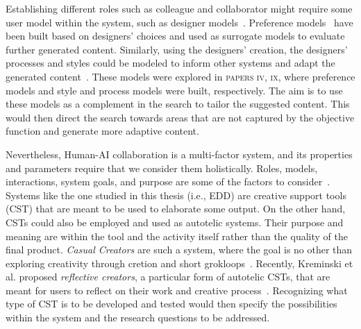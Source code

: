 Establishing different roles such as colleague and collaborator might require some user model within the system, such as designer models~\cite{liapis_designer_2013}. Preference models~\cite{alvarez_learning_2020,liapis_adapting_2012} have been built based on designers' choices and used as surrogate models to evaluate further generated content. Similarly, using the designers' creation, the designers' processes and styles could be modeled to inform other systems and adapt the generated content~\cite{liapis_designer_2014,alvarez_designer_2022,halina_threshold_2022}. These models were explored in \textsc{papers iv, ix}, where preference models and style and process models were built, respectively. The aim is to use these models as a complement in the search to tailor the suggested content. This would then direct the search towards areas that are not captured by the objective function and generate more adaptive content.

Nevertheless, Human-AI collaboration is a multi-factor system, and its properties and parameters require that we consider them holistically. Roles, models, interactions, system goals, and purpose are some of the factors to consider~\cite{chung_intersection_2021}. Systems like the one studied in this thesis (i.e., EDD) are creative support tools (CST) that are meant to be used to elaborate some output. On the other hand, CSTs could also be employed and used as autotelic systems. Their purpose and meaning are within the tool and the activity itself rather than the quality of the final product. \emph{Casual Creators} are such a system, where the goal is no other than exploring creativity through cretion and short grokloops~\cite{compton_casual_2015}. Recently, Kreminski et al. proposed  \emph{reflective creators}, a particular form of autotelic CSTs, that are meant for users to reflect on their work and creative process~\cite{kreminski_reflective_2021}. Recognizing what type of CST is to be developed and tested would then specify the possibilities within the system and the research questions to be addressed.%

